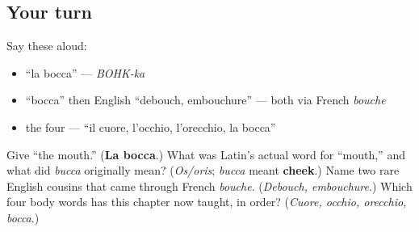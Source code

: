 \subsection*{Your turn}
Say these aloud:

\begin{itemize}
\raggedright
  \item \textquotedblleft{}la bocca\textquotedblright{} — \emph{BOHK-ka}
  \item \textquotedblleft{}bocca\textquotedblright{} then English \textquotedblleft{}debouch, embouchure\textquotedblright{} — both via French \emph{bouche}
  \item the four — \textquotedblleft{}il cuore, l'occhio, l'orecchio, la bocca\textquotedblright{}
\end{itemize}

\begin{tcolorbox}[breakable,colback=teal!4,colframe=teal!35!black,title={Before you move on}]
Give \textquotedblleft{}the mouth.\textquotedblright{} (\textbf{La bocca}.) What was Latin's actual word for \textquotedblleft{}mouth,\textquotedblright{} and what did \emph{bucca} originally mean? (\emph{Os/oris}; \emph{bucca} meant \textbf{cheek}.) Name two rare English cousins that came through French \emph{bouche}. (\emph{Debouch, embouchure}.) Which four body words has this chapter now taught, in order? (\emph{Cuore, occhio, orecchio, bocca}.)
\end{tcolorbox}
